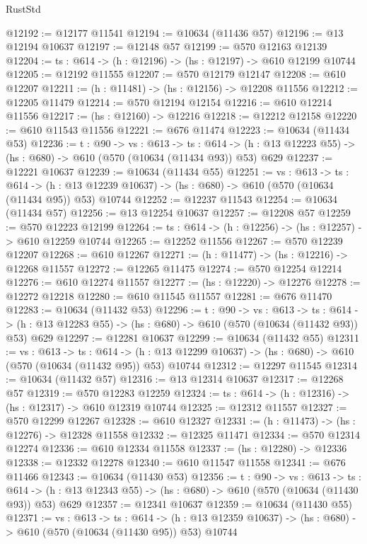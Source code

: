 \begin{lexlean}{RustStd}
\begin{coremodule}
@12192 := @12177 @11541
@12194 := @10634 (@11436 @57)
@12196 := @13 @12194 @10637
@12197 := @12148 @57
@12199 := @570 @12163 @12139
@12204 := {ts : @614} -> (h : @12196) -> (hs : @12197) -> @610 @12199 @10744
@12205 := @12192 @11555
@12207 := @570 @12179 @12147
@12208 := @610 @12207
@12211 := (h : @11481) -> (hs : @12156) -> @12208 @11556
@12212 := @12205 @11479
@12214 := @570 @12194 @12154
@12216 := @610 @12214 @11556
@12217 := (hs : @12160) -> @12216
@12218 := @12212 @12158
@12220 := @610 @11543 @11556
@12221 := @676 @11474
@12223 := @10634 (@11434 @53)
@12236 := {t : @90} ->
  {vs : @613} ->
  {ts : @614} -> (h : @13 @12223 @55) -> (hs : @680) -> @610 (@570 (@10634 (@11434 @93)) @53) @629
@12237 := @12221 @10637
@12239 := @10634 (@11434 @55)
@12251 := {vs : @613} ->
  {ts : @614} ->
  (h : @13 @12239 @10637) -> (hs : @680) -> @610 (@570 (@10634 (@11434 @95)) @53) @10744
@12252 := @12237 @11543
@12254 := @10634 (@11434 @57)
@12256 := @13 @12254 @10637
@12257 := @12208 @57
@12259 := @570 @12223 @12199
@12264 := {ts : @614} -> (h : @12256) -> (hs : @12257) -> @610 @12259 @10744
@12265 := @12252 @11556
@12267 := @570 @12239 @12207
@12268 := @610 @12267
@12271 := (h : @11477) -> (hs : @12216) -> @12268 @11557
@12272 := @12265 @11475
@12274 := @570 @12254 @12214
@12276 := @610 @12274 @11557
@12277 := (hs : @12220) -> @12276
@12278 := @12272 @12218
@12280 := @610 @11545 @11557
@12281 := @676 @11470
@12283 := @10634 (@11432 @53)
@12296 := {t : @90} ->
  {vs : @613} ->
  {ts : @614} -> (h : @13 @12283 @55) -> (hs : @680) -> @610 (@570 (@10634 (@11432 @93)) @53) @629
@12297 := @12281 @10637
@12299 := @10634 (@11432 @55)
@12311 := {vs : @613} ->
  {ts : @614} ->
  (h : @13 @12299 @10637) -> (hs : @680) -> @610 (@570 (@10634 (@11432 @95)) @53) @10744
@12312 := @12297 @11545
@12314 := @10634 (@11432 @57)
@12316 := @13 @12314 @10637
@12317 := @12268 @57
@12319 := @570 @12283 @12259
@12324 := {ts : @614} -> (h : @12316) -> (hs : @12317) -> @610 @12319 @10744
@12325 := @12312 @11557
@12327 := @570 @12299 @12267
@12328 := @610 @12327
@12331 := (h : @11473) -> (hs : @12276) -> @12328 @11558
@12332 := @12325 @11471
@12334 := @570 @12314 @12274
@12336 := @610 @12334 @11558
@12337 := (hs : @12280) -> @12336
@12338 := @12332 @12278
@12340 := @610 @11547 @11558
@12341 := @676 @11466
@12343 := @10634 (@11430 @53)
@12356 := {t : @90} ->
  {vs : @613} ->
  {ts : @614} -> (h : @13 @12343 @55) -> (hs : @680) -> @610 (@570 (@10634 (@11430 @93)) @53) @629
@12357 := @12341 @10637
@12359 := @10634 (@11430 @55)
@12371 := {vs : @613} ->
  {ts : @614} ->
  (h : @13 @12359 @10637) -> (hs : @680) -> @610 (@570 (@10634 (@11430 @95)) @53) @10744

\end{coremodule}
\end{lexlean}
